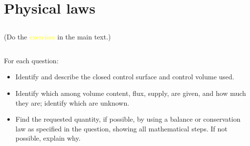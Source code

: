 \documentclass[a4paper,12pt,%
onecolumn,oneside,%
british%
]{memoir}
\renewcommand*{\|}[1][]{\nonscript\:#1\vert\nonscript\:\mathopen{}}
\begin{document}




\printpagenotes*
\clearpage
\chapter{Physical laws}
\label{cha:laws}
\setcounter{section}{-1}

\section{}
(Do the \textcolor{yellow}{exercises} in the main text.)



\section{}
\label{sec:calc_from_bal}

For each question:
\begin{itemize}[nosep]
\item Identify and describe the closed control surface and control volume used.
\item Identify which among volume content, flux, supply, are given, and how much they are; identify which are unknown.
\item Find the requested quantity, if possible, by using a balance or conservation law as specified in the question, showing all mathematical steps. If not possible, explain why.
\end{itemize}
\end{document}
